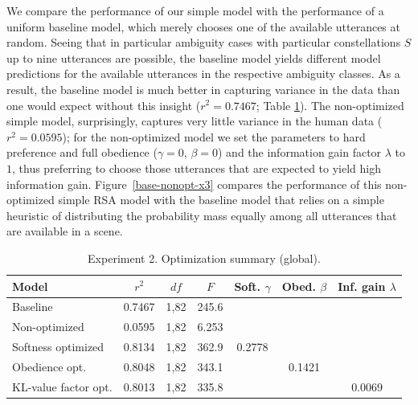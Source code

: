 \documentclass[11pt,a4paper]{article}
\begin{document}
We compare the performance of our simple model with the performance of a uniform baseline model, which merely chooses one of the available utterances at random. 
Seeing that in particular ambiguity cases with particular constellations $S$ up to nine utterances are possible, the baseline model yields different model predictions for the available utterances in the respective ambiguity classes. 
As a result, the baseline model is much better in capturing variance in the data than one would expect without this insight ($r^2 = 0.7467$; Table \ref{utterance_optimization}). The non-optimized simple model, surprisingly, captures very little variance in the human data ($r^2=0.0595$); for  the non-optimized model we set the parameters to hard preference and full obedience ($\gamma=0$, $\beta=0$) and the information gain factor $\lambda$ to $1$, thus preferring to choose those utterances that are expected to yield high information gain. Figure~\ref{base-nonopt-x3} compares the performance of this non-optimized simple RSA model with the baseline model that relies on a simple heuristic of distributing the probability mass equally among all utterances that are available in a scene.

	\begin{table}[htb]
	\centering
	\begin{tabular}{p{3.2cm}cccccc}
		\hline
		Model & $r^2$ & $df$ & $F$ & Soft. $\gamma$ & Obed. $\beta$ & Inf. gain $\lambda$ \\
		\hline
		
		Baseline & 0.7467 & 1,82 & 245.6 && & \\
		Non-optimized & 0.0595 & 1,82 & 6.253 &&& \\		
		Softness optimized & 0.8134 & 1,82 & 362.9 & 0.2778 && \\
		Obedience opt. & 0.8048 & 1,82 & 343.1 & & 0.1421 & \\
		KL-value factor opt. & 0.8013 & 1,82 & 335.8 & & & 0.0069 \\
		\hline
	\end{tabular}
	\caption{Experiment 2. Optimization summary (global).}
	\label{utterance_optimization}

\end{table}
\end{document}
